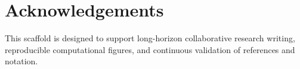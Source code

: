 \chapter*{Acknowledgements}

This scaffold is designed to support long-horizon collaborative research writing, reproducible computational figures, and continuous validation of references and notation.
